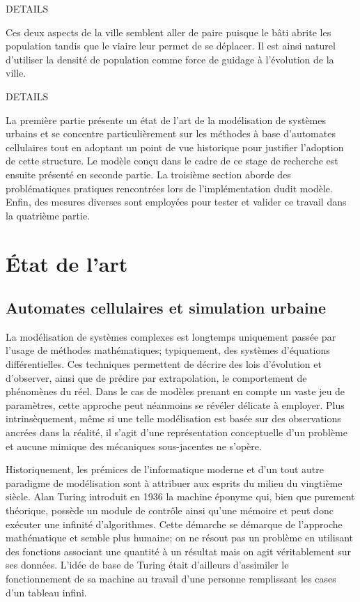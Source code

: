 \documentclass[12pt]{article}
\begin{document}
DETAILS

Ces deux aspects de la ville semblent aller de paire puisque le bâti
abrite les population tandis que le viaire leur permet de se
déplacer. Il est ainsi naturel d'utiliser la densité de population
comme force de guidage à l'évolution de la ville.

DETAILS

La première partie présente un état de l'art de la modélisation de
systèmes urbains et se concentre particulièrement sur les méthodes à
base d'automates cellulaires tout en adoptant un point de vue
historique pour justifier l'adoption de cette structure. Le modèle
conçu dans le cadre de ce stage de recherche est ensuite présenté en
seconde partie. La troisième section aborde des problématiques
pratiques rencontrées lors de l'implémentation dudit modèle. Enfin,
des mesures diverses sont employées pour tester et valider ce travail
dans la quatrième partie.

\section{\'Etat de l'art}

\subsection{Automates cellulaires et simulation urbaine}

La modélisation de systèmes complexes est longtemps uniquement passée
par l'usage de méthodes mathématiques; typiquement, des systèmes
d'équations différentielles. Ces techniques permettent de décrire des
lois d'évolution et d'observer, ainsi que de prédire par
extrapolation, le comportement de phénomènes du réel. Dans le cas de
modèles prenant en compte un vaste jeu de paramètres, cette approche
peut néanmoins se révéler délicate à employer. Plus intrinsèquement,
même si une telle modélisation est basée sur des observations ancrées
dans la réalité, il s'agit d'une représentation conceptuelle d'un
problème et aucune mimique des mécaniques sous-jacentes ne s'opère.

Historiquement, les prémices de l'informatique moderne et d'un tout
autre paradigme de modélisation sont à attribuer aux esprits du milieu
du vingtième siècle. Alan Turing introduit en 1936 la machine éponyme
qui, bien que purement théorique, possède un module de contrôle ainsi
qu'une mémoire et peut donc exécuter une infinité d'algorithmes. Cette
démarche se démarque de l'approche mathématique et semble plus
humaine; on ne résout pas un problème en utilisant des fonctions
associant une quantité à un résultat mais on agit véritablement sur
ses données. L'idée de base de Turing était d'ailleurs d'assimiler le
fonctionnement de sa machine au travail d'une personne remplissant les
cases d'un tableau infini.
\end{document}
